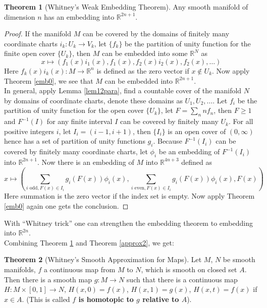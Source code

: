 \documentclass{article}
\theoremstyle{definition}
\newtheorem{thm}{Theorem}[section]
\begin{document}
\begin{thm}[Whitney's Weak Embedding Theorem]\label{whiemb}
    Any smooth manifold of dimension $n$ has an embedding into $\mathbb{R}^{2n+1}$.
\end{thm}

\begin{proof}
    If the manifold $M$ can be covered by the domains of finitely many coordinate charts $i_k: U_k\rightarrow V_k$, let $\{f_k\}$ be the partition of unity function for the finite open cover $\{U_k\}$, then $M$ can be embedded into some $\mathbb{R}^N$ as
    \[x\mapsto (f_1(x)i_1(x), f_1(x), f_2(x)i_2(x), f_2(x), \dots)\]
    Here $f_k(x)i_k(x): M\rightarrow \mathbb{R}^n$ is defined as the zero vector if $x\not\in U_k$. Now apply Theorem \ref{emb0}, we see that $M$ can be embedded into $\mathbb{R}^{2n+1}$.\\

    In general, apply Lemma \ref{lem12para}, find a countable cover of the manifold $N$ by domains of coordinate charts, denote these domains as $U_1, U_2, \dots$. Let $f_i$ be the partition of unity function for the open cover $\{U_k\}$, let $F=\sum_n nf_n$, then $F\geq 1$ and $F^{-1}(I)$ for any finite interval $I$ can be covered by finitely many $U_k$. For all positive integers $i$, let $I_i=(i-1, i+1)$, then $\{I_i\}$ is an open cover of $(0, \infty)$ hence has a set of partition of unity functions $g_i$. Because $F^{-1}(I_i)$ can be covered by finitely many coordinate charts, let $\phi_i$ be an embedding of $F^{-1}(I_i)$ into $\mathbb{R}^{2n+1}$. Now there is an embedding of $M$ into $\mathbb{R}^{4n+3}$ defined as
    \[x\mapsto (\sum_{i\text{ odd}, F(x)\in I_i}g_i(F(x))\phi_i(x), \sum_{i\text{ even}, F(x)\in I_i}g_i(F(x))\phi_i(x), F(x))\]
    Here summation is the zero vector if the index set is empty.
    Now apply Theorem \ref{emb0} again one gets the conclusion.
\end{proof}

With ``Whitney trick'' one can strengthen the embedding theorem to embedding into $\mathbb{R}^{2n}$.\\

Combining Theorem \ref{whiemb} and Theorem \ref{approx2}, we get:

\begin{thm}[Whitney's Smooth Approximation for Maps]\label{approx3}
Let $M$, $N$ be smooth manifolds, $f$ a continuous map from $M$ to $N$, which is smooth on closed set $A$. Then there is a smooth map $g: M\rightarrow N$ such that there is a continuous map $H: M\times [0, 1]\rightarrow N$, $H(x, 0)=f(x)$, $H(x, 1)=g(x)$, $H(x, t)=f(x)$ if $x\in A$. (This is called {\bf $f$ is homotopic to $g$ relative to $A$}).
\end{thm}
\end{document}
